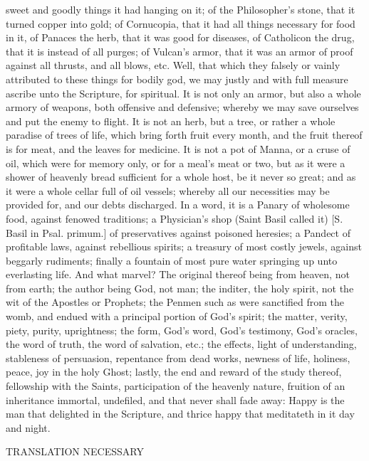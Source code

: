 {sweet and goodly things it had hanging on it; of the Philosopher’s stone, that it turned copper into gold; of Cornucopia, that it had all things necessary for food in it, of Panaces the herb, that it was good for diseases, of Catholicon the drug, that it is instead of all purges; of Vulcan’s armor, that it was an armor of proof against all thrusts, and all blows, etc. Well, that which they falsely or vainly attributed to these things for bodily god, we may justly and with full measure ascribe unto the Scripture, for spiritual. It is not only an armor, but also a whole armory of weapons, both offensive and defensive; whereby we may save ourselves and put the enemy to flight. It is not an herb, but a tree, or rather a whole paradise of trees of life, which bring forth fruit every month, and the fruit thereof is for meat, and the leaves for medicine. It is not a pot of Manna, or a cruse of oil, which were for memory only, or for a meal’s meat or two, but as it were a shower of heavenly bread sufficient for a whole host, be it never so great; and as it were a whole cellar full of oil vessels; whereby all our necessities may be provided for, and our debts discharged. In a word, it is a Panary of wholesome food, against fenowed traditions; a Physician’s shop (Saint Basil called it) [S. Basil in Psal. primum.] of preservatives against poisoned heresies; a Pandect of profitable laws, against rebellious spirits; a treasury of most costly jewels, against beggarly rudiments; finally a fountain of most pure water springing up unto everlasting life. And what marvel? The original thereof being from heaven, not from earth; the author being God, not man; the inditer, the holy spirit, not the wit of the Apostles or Prophets; the Penmen such as were sanctified from the womb, and endued with a principal portion of God’s spirit; the matter, verity, piety, purity, uprightness; the form, God’s word, God’s testimony, God’s oracles, the word of truth, the word of salvation, etc.; the effects, light of understanding, stableness of persuasion, repentance from dead works, newness of life, holiness, peace, joy in the holy Ghost; lastly, the end and reward of the study thereof, fellowship with the Saints, participation of the heavenly nature, fruition of an inheritance immortal, undefiled, and that never shall fade away: Happy is the man that delighted in the Scripture, and thrice happy that meditateth in it day and night.
\par }{\IS TRANSLATION NECESSARY
}
